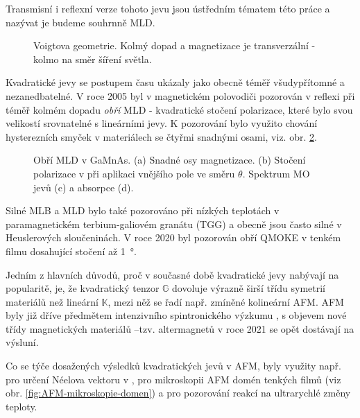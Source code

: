 Transmisní i reflexní verze tohoto jevu jsou ústředním tématem této práce a nazývat je budeme souhrnně MLD.

\begin{figure}[htbp]
    \centering
    \caption{Voigtova geometrie. Kolmý dopad a magnetizace je transverzální - kolmo na směr šíření světla.}
    \label{fig:Voigtova-geometrie}
\end{figure}

Kvadratické jevy se postupem času ukázaly jako obecně téměř všudypřítomné a nezanedbatelné.
V roce 2005 byl v magnetickém polovodiči  pozorován v reflexi při téměř kolmém dopadu \emph{obří} MLD - kvadratické stočení polarizace, které bylo svou velikostí srovnatelné s lineárními jevy.
K pozorování bylo využito chování hysterezních smyček v materiálech se čtyřmi snadnými osami, viz. obr. \ref{fig:obri-MLD}.

\begin{figure}[htbp]
    \centering
    \caption{Obří MLD v GaMnAs. (a) Snadné osy magnetizace. (b) Stočení polarizace v při aplikaci vnějšího pole ve směru $\theta$. Spektrum MO jevů (c) a absorpce (d).}
    \label{fig:obri-MLD}
\end{figure}

Silné MLB a MLD bylo také pozorováno při nízkých teplotách v paramagnetickém terbium-galiovém granátu (TGG) a obecně jsou často silné v Heuslerových sloučeninách.
V roce 2020 byl pozorován obří QMOKE v tenkém filmu  dosahující stočení až \SI{1}{\degree}.

Jedním z hlavních důvodů, proč v současné době kvadratické jevy nabývají na popularitě, je, že kvadratický tenzor $\mathbb{G}$ dovoluje výrazně širší třídu symetrií materiálů než lineární $\mathbb{K}$, mezi něž se řadí např. zmíněné kolineární AFM. 
AFM byly již dříve předmětem intenzivního spintronického výzkumu , 
s objevem nové třídy magnetických materiálů --\tododash tzv. altermagnetů v roce 2021 se opět dostávají na výsluní.

Co se týče dosažených výsledků kvadratických jevů v AFM, byly využity např. pro určení Néelova vektoru v , pro mikroskopii AFM domén tenkých filmů  (viz obr. \ref{fig:AFM-mikroskopie-domen}) a pro pozorování reakcí  na ultrarychlé změny teploty.



